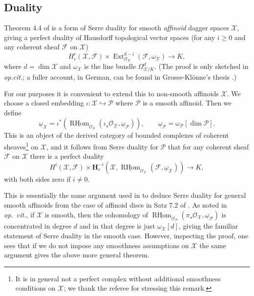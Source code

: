\documentclass[cjm]{ipart}
\theoremstyle{plain}
\theoremstyle{remark}
\newcommand{\HH}{\mathbf{H}}
\newcommand{\cF}{\mathcal{F}}
\newcommand{\cO}{\mathcal{O}}
\newcommand{\cP}{\mathcal{P}}
\newcommand{\cX}{\mathcal{X}}
\newcommand{\into}{\hookrightarrow}
\numberwithin{equation}{subsection}
\renewcommand{\ge}{\geqslant}
\begin{document}
  \subsection{Duality}
  \label{sect:serredual}

   Theorem 4.4 of \cite{grossekloenne00} is a form of Serre duality for smooth \emph{affinoid} dagger spaces $\cX$, giving a perfect duality of Hausdorff topological vector spaces (for any $i \ge 0$ and any coherent sheaf $\cF$ on $\cX$)
   \[ H^i_c(\cX, \cF) \times \operatorname{Ext}^{d-i}_{\cO_X}\left(\cF, \omega_\cX\right) \to K, \]
   where $d = \operatorname{dim} \cX$ and $\omega_{\cX}$ is the line bundle $\Omega^d_{\cX / K}$. (The proof is only sketched in \emph{op.cit.}; a fuller account, in German, can be found in  Grosse-Kl\"onne's thesis \cite[\S 7.1]{grossekloenne-thesis}.)

   For our purposes it is convenient to extend this to non-smooth affinoids $\cX$. We choose a closed embedding $\iota: \cX \into \cP$ where $\cP$ is a smooth affinoid. Then we define
   \[ \underline{\omega}_{\cX} = \iota^*\left( \underline{\operatorname{RHom}}_{\cO_\cP}\left(\iota_\star \cO_\cX, \underline{\omega}_{\cP}\right)\right),\qquad \underline{\omega}_{\cP} = \omega_{\cP}[\dim \cP]. \]
   This is an object of the derived category of bounded complexes of coherent sheaves\footnote{It is in general not a perfect complex without additional smoothness conditions on $\cX$; we thank the referee for stressing this remark.} on $\cX$, and it follows from Serre duality for $\cP$ that for any coherent sheaf $\cF$ on $\cX$ there is a perfect duality
   \[ 
    H^i(\cX, \cF) \times \HH^{-i}_c\left(\cX, \underline{\operatorname{RHom}}_{\cO_{\cX}}(\cF, \underline{\omega}_{\cX})\right) \to K, 
   \]
   with both sides zero if $i \ne 0$. 
   
   \begin{remark}
    This is essentially the same argument used in to deduce Serre duality for general smooth affinoids from the case of affinoid discs in Satz 7.2 of \cite{grossekloenne-thesis}. As noted in \emph{op.~cit.}, if $\cX$ is smooth, then the cohomology of $\underline{\operatorname{RHom}}_{\cO_\cP}\left(\pi_\star \cO_\cX, \underline{\omega}_{\cP}\right)$ is concentrated in degree $d$ and in that degree is just $\omega_{\cX}[d]$, giving the familiar statement of Serre duality in the smooth case. However, inspecting the proof, one sees that if we do not impose any smoothness assumptions on $\cX$ the same argument gives the above more general theorem. 
   \end{remark}
   
\end{document}
